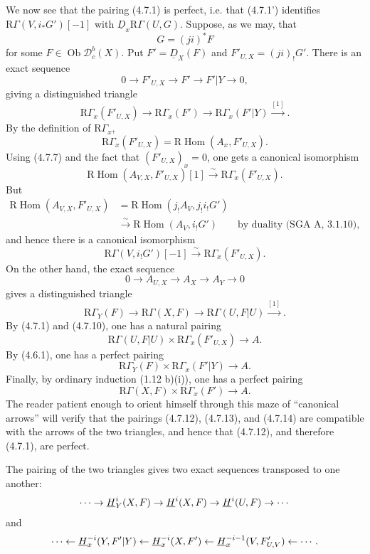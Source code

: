 \documentclass[11pt]{article}
\theoremstyle{plain}
\theoremstyle{definition}
\theoremstyle{remark}
\newcommand{\D}{\mathcal D}\newcommand{\E}{\mathcal E}\newcommand{\F}{\mathcal F}
\DeclareMathOperator{\Hom}{Hom}
\DeclareMathOperator{\ob}{Ob}
\newcommand{\R}{\mathrm R}
\begin{document}
We now see that the pairing (4.7.1) is perfect, i.e. that (4.7.1') identifies $\R\Gamma(V,i_*G')[-1]$ with $\underline D_x\R\Gamma(U,G)$. Suppose, as we may, that
\[
   G=(ji)^*F
\]
for some $F\in\ob\D_c^b(X)$. Put $F'=\underline D_X(F)$ and $F'_{U,X}=(ji)_!G'$. There is an exact sequence
\[
   0\longrightarrow F'_{U,X}\longrightarrow F'
      \longrightarrow F'|Y\longrightarrow0,\tag{4.7.9}
\]
giving a distinguished triangle
\[
   \R\Gamma_x(F'_{U,X})\to \R\Gamma_x(F')\to
      \R\Gamma_x(F'|Y)\xrightarrow{[1]}.
\]
By the definition of $\R\Gamma_x$,
\[
   \R\Gamma_x(F'_{U,X})=\R\Hom(A_x,F'_{U,X}).
\]
Using (4.7.7) and the fact that $(F'_{U,X})_x=0$, one gets a canonical isomorphism
\[
   \R\Hom(A_{V,X},F'_{U,X})[1]
      \xrightarrow{\sim}\R\Gamma_x(F'_{U,X}).
\]
But
\[
\begin{aligned}
\R\Hom(A_{V,X},F'_{U,X})
&=\R\Hom(j_!A_V,j_!i_!G')\\
&\xrightarrow{\sim}\R\Hom(A_V,i_!G')
     \qquad\text{by duality (SGA A, 3.1.10)},
\end{aligned}
\]
and hence there is a canonical isomorphism
\[
   \R\Gamma(V,i_!G')[-1]
      \xrightarrow{\sim}\R\Gamma_x(F'_{U,X}).\tag{4.7.10}
\]
On the other hand, the exact sequence
\[
   0\longrightarrow A_{U,X}\longrightarrow A_X\longrightarrow A_Y\longrightarrow0\tag{4.7.11}
\]
gives a distinguished triangle
\[
   \R\Gamma_Y(F)\to \R\Gamma(X,F)\to
   \R\Gamma(U,F|U)\xrightarrow{[1]}.
\]
By (4.7.1) and (4.7.10), one has a natural pairing
\[
   \R\Gamma(U,F|U)\times \R\Gamma_x(F'_{U,X})\longrightarrow A.\tag{4.7.12}
\]
By (4.6.1), one has a perfect pairing
\[
   \R\Gamma_Y(F)\times \R\Gamma_x(F'|Y)\longrightarrow A.\tag{4.7.13}
\]
Finally, by ordinary induction (1.12 b)(i)), one has a perfect pairing
\[
   \R\Gamma(X,F)\times \R\Gamma_x(F')\longrightarrow A.\tag{4.7.14}
\]
The reader patient enough to orient himself through this maze of ``canonical arrows'' will verify that the pairings (4.7.12), (4.7.13), and (4.7.14) are compatible with the arrows of the two triangles, and hence that (4.7.12), and therefore (4.7.1), are perfect.

The pairing of the two triangles gives two exact sequences transposed to one another:
\[
   \cdots\to \underline{H}^i_Y(X,F)\to \underline{H}^i(X,F)\to \underline{H}^i(U,F)\to\cdots
\]
and
\[
   \cdots\leftarrow \underline{H}^{-i}_x(Y,F'|Y)
      \leftarrow \underline{H}^{-i}_x(X,F')
      \leftarrow \underline{H}^{-i-1}_x(V,F'_{U,V})\leftarrow\cdots.
\]
\end{document}
